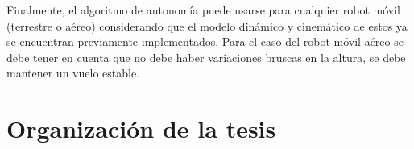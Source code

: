 Finalmente, el algoritmo de autonom\'ia puede usarse para cualquier robot m\'ovil (terrestre 
o a\'ereo) considerando que el modelo din\'amico y cinem\'atico de estos ya se encuentran 
previamente implementados. Para el caso del robot m\'ovil a\'ereo se debe tener en cuenta 
que no debe haber variaciones bruscas en la altura, se debe mantener un vuelo estable.






\section{Organizaci\'on de la tesis}

